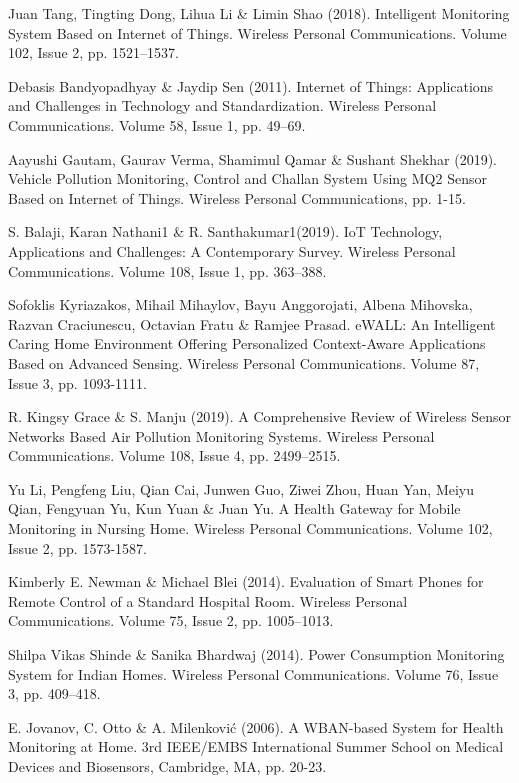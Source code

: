 \begin{thebibliography}{}
Juan Tang, Tingting Dong, Lihua Li \& Limin Shao (2018). Intelligent Monitoring System Based on Internet of Things.  Wireless Personal Communications. Volume 102, Issue 2, pp. 1521–1537.

Debasis Bandyopadhyay \& Jaydip Sen (2011). Internet of Things: Applications and Challenges in Technology and Standardization.  Wireless Personal Communications. Volume 58, Issue 1, pp. 49–69.

Aayushi Gautam, Gaurav Verma, Shamimul Qamar \& Sushant Shekhar (2019). Vehicle Pollution Monitoring, Control and Challan System Using MQ2 Sensor Based on Internet of Things. Wireless Personal Communications, pp. 1-15.

S. Balaji, Karan Nathani1 \& R. Santhakumar1(2019). IoT Technology, Applications and Challenges: A Contemporary Survey.  Wireless Personal Communications. Volume 108, Issue 1, pp. 363–388.

Sofoklis Kyriazakos, Mihail Mihaylov, Bayu Anggorojati, Albena Mihovska, Razvan Craciunescu, Octavian Fratu \& Ramjee Prasad. eWALL: An Intelligent Caring Home Environment Offering Personalized Context-Aware Applications Based on Advanced Sensing.  Wireless Personal Communications. Volume 87, Issue 3, pp. 1093-1111.

R. Kingsy Grace \& S. Manju (2019). A Comprehensive Review of Wireless Sensor Networks Based Air Pollution Monitoring Systems.  Wireless Personal Communications. Volume 108, Issue 4, pp. 2499–2515.

Yu Li, Pengfeng Liu, Qian Cai, Junwen Guo, Ziwei Zhou, Huan Yan, Meiyu Qian, Fengyuan Yu, Kun Yuan \& Juan Yu. A Health Gateway for Mobile Monitoring in Nursing Home. Wireless Personal Communications. Volume 102, Issue 2, pp. 1573-1587.

Kimberly E. Newman \& Michael Blei (2014). Evaluation of Smart Phones for Remote Control of a Standard Hospital Room. Wireless Personal Communications. Volume 75, Issue 2, pp. 1005–1013.

Shilpa Vikas Shinde \& Sanika Bhardwaj (2014). Power Consumption Monitoring System for Indian Homes.  Wireless Personal Communications. Volume 76, Issue 3, pp. 409–418.

E. Jovanov, C. Otto \& A. Milenković (2006). A WBAN-based System for Health Monitoring at Home. 3rd IEEE/EMBS International Summer School on Medical Devices and Biosensors, Cambridge, MA, pp. 20-23.

\end{thebibliography}

